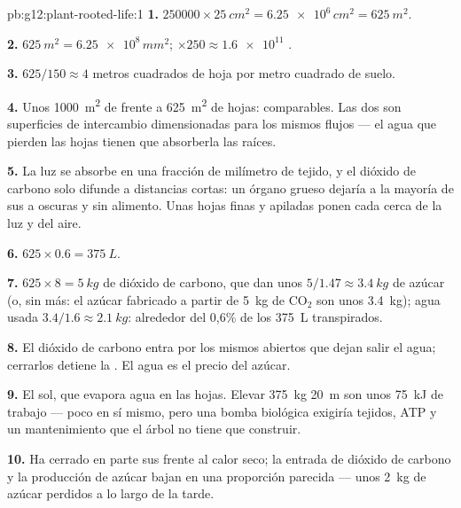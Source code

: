 \begin{solution}{pb:g12:plant-rooted-life:1}
\textbf{1.} $\num{250000} \times \qty{25}{cm^2} = \num{6.25e6}\,
\unit{cm^2} = \qty{625}{m^2}$.

\textbf{2.} $\qty{625}{m^2} = \num{6.25e8}\,\unit{mm^2}$; $\times 250
\approx \num{1.6e11}$ .

\textbf{3.} $625/150 \approx 4$ metros cuadrados de hoja por metro
cuadrado de suelo.

\textbf{4.} Unos \qty{1000}{m^2} de  frente a
\qty{625}{m^2} de hojas: comparables. Las dos son superficies de
intercambio dimensionadas para los mismos flujos --- el agua que
pierden las hojas tienen que absorberla las raíces.

\textbf{5.} La luz se absorbe en una fracción de milímetro de tejido, y
el dióxido de carbono solo difunde a distancias cortas: un órgano
grueso dejaría a la mayoría de sus  a oscuras y sin alimento.
Unas hojas finas y apiladas ponen cada  cerca de la luz y del
aire.

\textbf{6.} $625 \times 0.6 = \qty{375}{L}$.

\textbf{7.} $625 \times 8 = \qty{5}{kg}$ de dióxido de carbono, que dan
unos $5/1.47 \approx \qty{3.4}{kg}$ de azúcar (o, sin más: el azúcar
fabricado a partir de \qty{5}{kg} de $\mathrm{CO_2}$ son unos
\qty{3.4}{kg}); agua usada $3.4/1.6 \approx \qty{2.1}{kg}$: alrededor
del 0,6\% de los \qty{375}{L} transpirados.

\textbf{8.} El dióxido de carbono entra por los mismos  abiertos
que dejan salir el agua; cerrarlos detiene la . El agua es
el precio del azúcar.

\textbf{9.} El sol, que evapora agua en las hojas. Elevar
\qty{375}{kg} \qty{20}{m} son unos \qty{75}{kJ} de trabajo --- poco en
sí mismo, pero una bomba biológica exigiría tejidos, ATP y un
mantenimiento que el árbol no tiene que construir.

\textbf{10.} Ha cerrado en parte sus  frente al calor seco; la
entrada de dióxido de carbono y la producción de azúcar bajan en una
proporción parecida --- unos \qty{2}{kg} de azúcar perdidos a lo largo
de la tarde.


\end{solution}
